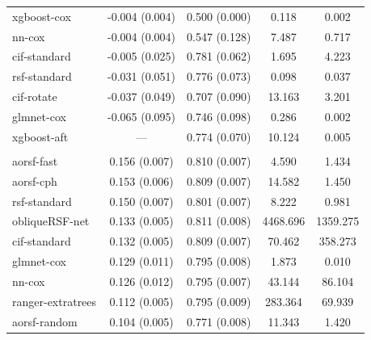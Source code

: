 \documentclass[12pt]{article}\usepackage[]{graphicx}\usepackage[]{xcolor}
\newenvironment{knitrout}{}{} %
\begin{document}
\begin{knitrout}
\begin{longtable}[t]{lcccc}
\hspace{1em}xgboost-cox & -0.004 (0.004) & 0.500 (0.000) & 0.118 & 0.002\\
\hspace{1em}nn-cox & -0.004 (0.004) & 0.547 (0.128) & 7.487 & 0.717\\
\hspace{1em}cif-standard & -0.005 (0.025) & 0.781 (0.062) & 1.695 & 4.223\\
\hspace{1em}rsf-standard & -0.031 (0.051) & 0.776 (0.073) & 0.098 & 0.037\\
\hspace{1em}cif-rotate & -0.037 (0.049) & 0.707 (0.090) & 13.163 & 3.201\\
\hspace{1em}glmnet-cox & -0.065 (0.095) & 0.746 (0.098) & 0.286 & 0.002\\
\hspace{1em}xgboost-aft & --- & 0.774 (0.070) & 10.124 & 0.005\\
\addlinespace[0.3em]
\multicolumn{5}{l}{\textit{\textbf{ARIC; coronary heart disease, n = 13623, p = 41}}}\\
\hline
\hspace{1em}aorsf-fast & 0.156 (0.007) & 0.810 (0.007) & 4.590 & 1.434\\
\hspace{1em}aorsf-cph & 0.153 (0.006) & 0.809 (0.007) & 14.582 & 1.450\\
\hspace{1em}rsf-standard & 0.150 (0.007) & 0.801 (0.007) & 8.222 & 0.981\\
\hspace{1em}obliqueRSF-net & 0.133 (0.005) & 0.811 (0.008) & 4468.696 & 1359.275\\
\hspace{1em}cif-standard & 0.132 (0.005) & 0.809 (0.007) & 70.462 & 358.273\\
\hspace{1em}glmnet-cox & 0.129 (0.011) & 0.795 (0.008) & 1.873 & 0.010\\
\hspace{1em}nn-cox & 0.126 (0.012) & 0.795 (0.007) & 43.144 & 86.104\\
\hspace{1em}ranger-extratrees & 0.112 (0.005) & 0.795 (0.009) & 283.364 & 69.939\\
\hspace{1em}aorsf-random & 0.104 (0.005) & 0.771 (0.008) & 11.343 & 1.420\\

\end{longtable}
\end{knitrout}
\end{document}
